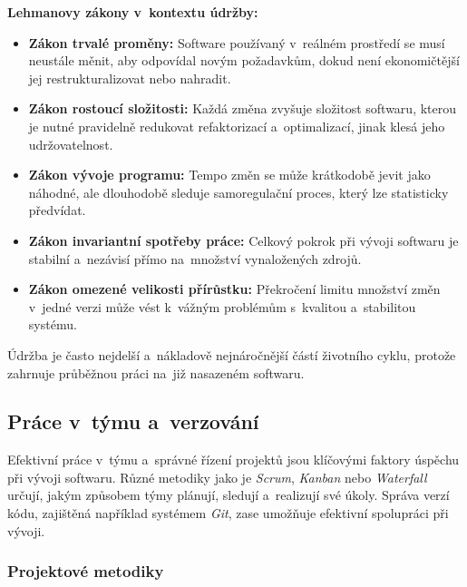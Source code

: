 \documentclass[male,czech,api_bc]{kitheses}
\begin{document}
\textbf{Lehmanovy zákony v~kontextu údržby:}
\begin{itemize}
	\item \textbf{Zákon trvalé proměny:} Software používaný v~reálném prostředí se musí neustále měnit, aby odpovídal novým požadavkům, dokud není ekonomičtější jej restrukturalizovat nebo nahradit.
	\item \textbf{Zákon rostoucí složitosti:} Každá změna zvyšuje složitost softwaru, kterou je nutné pravidelně redukovat refaktorizací a~optimalizací, jinak klesá jeho udržovatelnost.
	\item \textbf{Zákon vývoje programu:} Tempo změn se může krátkodobě jevit jako náhodné, ale dlouhodobě sleduje samoregulační proces, který lze statisticky předvídat.
	\item \textbf{Zákon invariantní spotřeby práce:} Celkový pokrok při vývoji softwaru je stabilní a~nezávisí přímo na~množství vynaložených zdrojů.
	\item \textbf{Zákon omezené velikosti přírůstku:} Překročení limitu množství změn v~jedné verzi může vést k~vážným problémům s~kvalitou a~stabilitou systému.
\end{itemize}

Údržba je často nejdelší a~nákladově nejnáročnější částí životního cyklu, protože zahrnuje průběžnou práci na~již nasazeném softwaru.

\subsection{Práce v~týmu a~verzování}

Efektivní práce v~týmu a~správné řízení projektů jsou klíčovými faktory úspěchu při vývoji softwaru. Různé metodiky jako je \textit{Scrum}, \textit{Kanban} nebo \textit{Waterfall} určují, jakým způsobem týmy plánují, sledují a~realizují své úkoly. Správa verzí kódu, zajištěná například systémem \textit{Git}, zase umožňuje efektivní spolupráci při vývoji.

\subsubsection{Projektové metodiky}
\end{document}

